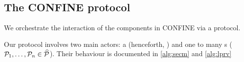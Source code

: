\subsection{The CONFINE protocol}
We orchestrate the interaction of the components in CONFINE via a protocol.

Our protocol involves two main actors: a  (henceforth, \SecM) and one to many s ($\mathcal{P}_1, \ldots, \mathcal{P}_n \in \widehat{\mathcal{P}}$). Their behaviour is documented in \cref{alg:secm} and \cref{alg:lprv}


